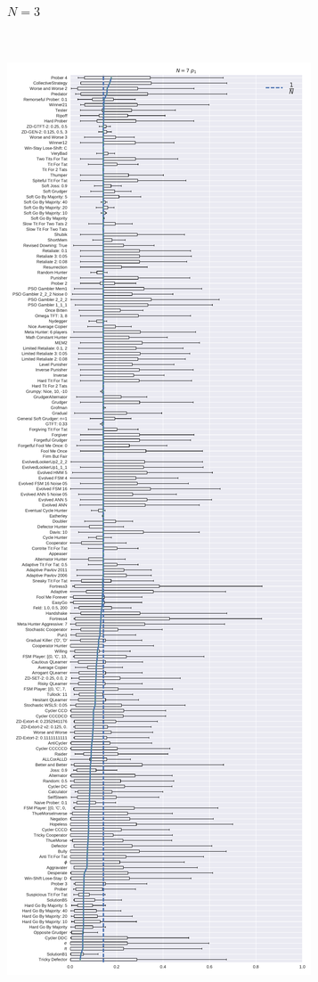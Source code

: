 \documentclass{article}
\begin{document}
\begin{figure}[!hbtp]
\begin{subfigure}[t]{.3\textwidth}
        \caption{\(N=3\)}
    \end{subfigure}%
    ~
    \begin{subfigure}[t]{.3\textwidth}
        \centering
        \includegraphics[width=\textwidth]{./img/boxplot_7_invade.pdf}

\end{subfigure}
\end{figure}
\end{document}
